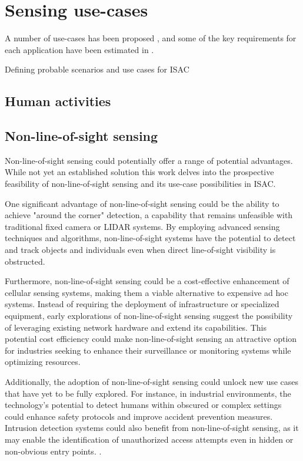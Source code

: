 \section{Sensing use-cases}

A number of use-cases has been proposed \cite{Mandelli_Henninger_Bauhofer_Wild_2023}, \cite{Wang_Varshney_Gentile_Blandino_Chuang_Golmie_2022} and some of the  key requirements for each application have been estimated in \cite{Wild_Braun_Viswanathan_2021}.

Defining probable scenarios and use cases for ISAC 


\subsection{Human activities}



\subsection{Non-line-of-sight sensing}



Non-line-of-sight sensing could potentially offer a range of potential advantages. While not yet an established solution this work delves into the prospective feasibility of non-line-of-sight sensing and its use-case possibilities in ISAC.

One significant advantage of non-line-of-sight sensing could be the ability to achieve "around the corner" detection, a capability that remains unfeasible with traditional fixed camera or LIDAR systems. By employing advanced sensing techniques and algorithms, non-line-of-sight systems have the potential to detect and track objects and individuals even when direct line-of-sight visibility is obstructed.

Furthermore, non-line-of-sight sensing could be a cost-effective enhancement of cellular sensing systems, making them a viable alternative to expensive ad hoc systems. Instead of requiring the deployment of infrastructure or specialized equipment, early explorations of non-line-of-sight sensing suggest the possibility of leveraging existing network hardware and extend its capabilities. This potential cost efficiency could make non-line-of-sight sensing an attractive option for industries seeking to enhance their surveillance or monitoring systems while optimizing resources.

Additionally, the adoption of non-line-of-sight sensing could unlock new use cases that have yet to be fully explored. For instance, in industrial environments, the technology's potential to detect humans within obscured or complex settings could enhance safety protocols and improve accident prevention measures. Intrusion detection systems could also benefit from non-line-of-sight sensing, as it may enable the identification of unauthorized access attempts even in hidden or non-obvious entry points. 
.

